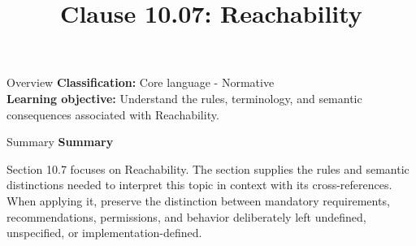 \documentclass[10pt,letterpaper]{article}
\title{Clause 10.07: Reachability}
\author{}
\date{}
\begin{document}
\maketitle
\begin{CornellOverviewBox}{Overview}
\textbf{Classification:} Core language - Normative\\[2pt]
\textbf{Learning objective:} Understand the rules, terminology, and semantic consequences associated with Reachability.
\end{CornellOverviewBox}\begin{CornellSummaryBox}{Summary}
{\sffamily\bfseries\color{Accent} Summary}\par\vspace{3pt}Section 10.7 focuses on Reachability. The section supplies the rules and semantic distinctions needed to interpret this topic in context with its cross-references. When applying it, preserve the distinction between mandatory requirements, recommendations, permissions, and behavior deliberately left undefined, unspecified, or implementation-defined.
\end{CornellSummaryBox}
\end{document}
